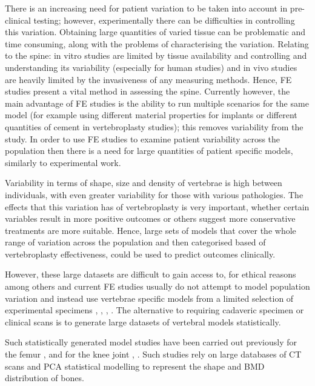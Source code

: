 There is an increasing need for patient variation to be taken into
account in pre-clinical testing; however, experimentally there can be
difficulties in controlling this variation. Obtaining large quantities
of varied tissue can be problematic and time consuming, along with the
problems of characterising the variation. Relating to the spine: in
vitro studies are limited by tissue availability and controlling and
understanding its variability (especially for human studies) and in vivo
studies are heavily limited by the invasiveness of any measuring
methods. Hence, FE studies present a vital method in assessing the
spine. Currently however, the main advantage of FE studies is the
ability to run multiple scenarios for the same model (for example using different material properties for implants or different quantities of cement in vertebroplasty studies); this removes variability from the study. In
order to use FE studies to examine patient variability across the
population then there is a need for large quantities of patient specific
models, similarly to experimental work.

Variability in terms of shape, size and density of vertebrae is high
between individuals, with even greater variability for those with
various pathologies. The effects that this variation has of
vertebroplasty is very important, whether certain variables result in
more positive outcomes or others suggest more conservative treatments
are more suitable. Hence, large sets of models that cover the whole
range of variation across the population and then categorised based of
vertebroplasty effectiveness, could be used to predict outcomes
clinically.

However, these large datasets are difficult to gain access to,
for ethical reasons among others \cite{Grassi2014} and current FE studies
usually
do not attempt to model population variation and instead use vertebrae
specific models from a limited selection of experimental specimens
\cite{Buckley2006}, \cite{Kinzl2012}, \cite{Wijayathunga2008},
\cite{Chevalier2008}. The
alternative to
requiring
cadaveric specimen or clinical scans is to generate large datasets of
vertebral models statistically.

Such statistically generated model studies have been carried out
previously for the femur \cite{Grassi2014}, \cite{Vaananen2015} and for the
knee joint
\cite{Rao2013}, \cite{Fitzpatrick2011}. Such studies rely on large databases of
CT scans and
PCA statistical modelling to represent the shape and BMD distribution of bones.

